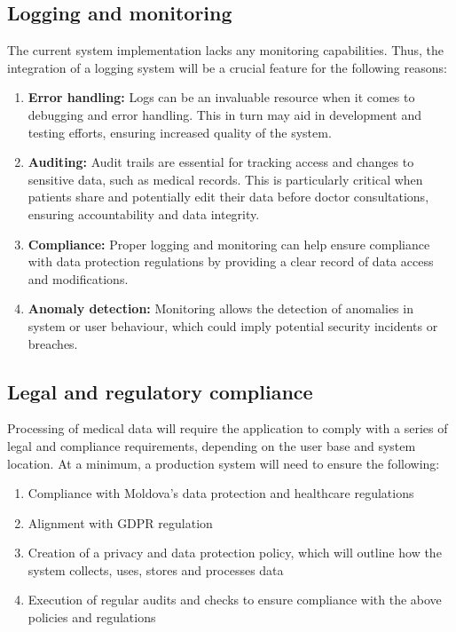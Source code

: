 \subsection{Logging and monitoring}

The current system implementation lacks any monitoring capabilities. Thus, the integration of a logging system will be a crucial feature for the following reasons:

\begin{enumerate}
    \item \textbf{Error handling:} Logs can be an invaluable resource when it comes to debugging and error handling. This in turn may aid in development and testing efforts, ensuring increased quality of the system.
    \item \textbf{Auditing:} Audit trails are essential for tracking access and changes to sensitive data, such as medical records. This is particularly critical when patients share and potentially edit their data before doctor consultations, ensuring accountability and data integrity.
    \item \textbf{Compliance:} Proper logging and monitoring can help ensure compliance with data protection regulations by providing a clear record of data access and modifications. 
    \item \textbf{Anomaly detection:} Monitoring allows the detection of anomalies in system or user behaviour, which could imply potential security incidents or breaches.
\end{enumerate}

\subsection{Legal and regulatory compliance}

Processing of medical data will require the application to comply with a series of legal and compliance requirements, depending on the user base and system location. At a minimum, a production system will need to ensure the following:

\begin{enumerate}
    \item Compliance with Moldova's data protection and healthcare regulations
    \item Alignment with GDPR regulation
    \item Creation of a privacy and data protection policy, which will outline how the system collects, uses, stores and processes data
    \item Execution of regular audits and checks to ensure compliance with the above policies and regulations
\end{enumerate}

